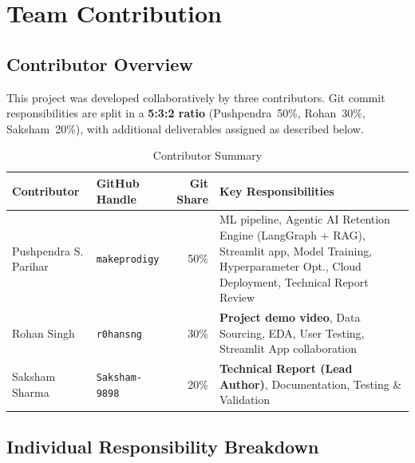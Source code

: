 \documentclass[12pt,a4paper]{article}
\begin{document}
\section{Team Contribution}

\subsection{Contributor Overview}

This project was developed collaboratively by three contributors. Git commit responsibilities are split in a \textbf{5:3:2 ratio} (Pushpendra~50\%, Rohan~30\%, Saksham~20\%), with additional deliverables assigned as described below.

\begin{table}[H]
\centering
\caption{Contributor Summary}
\begin{tabular}{llrp{5.5cm}}
    \toprule
    \textbf{Contributor} & \textbf{GitHub Handle} & \textbf{Git Share} & \textbf{Key Responsibilities} \\
    \midrule
    Pushpendra S. Parihar & \texttt{makeprodigy}
        & 50\%
        & ML pipeline, Agentic AI Retention Engine (LangGraph + RAG), Streamlit app, Model Training, Hyperparameter Opt., Cloud Deployment, Technical Report Review \\
    Rohan Singh & \texttt{r0hansng}
        & 30\%
        & \textbf{Project demo video}, Data Sourcing, EDA, User Testing, Streamlit App collaboration \\
    Saksham Sharma & \texttt{Saksham-9898}
        & 20\%
        & \textbf{Technical Report (Lead Author)}, Documentation, Testing \& Validation \\
    \bottomrule
\end{tabular}
\end{table}

\subsection{Individual Responsibility Breakdown}
\end{document}
